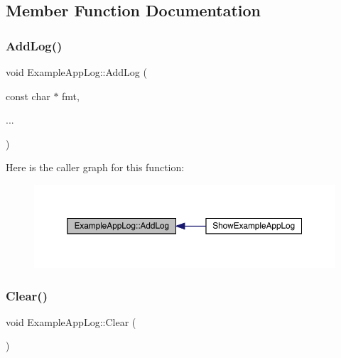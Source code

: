 \subsection{Member Function Documentation}
\mbox{\label{struct_example_app_log_afd296fb3b2559acd341fd92883f8f571}} 
\subsubsection{\texorpdfstring{Add\+Log()}{AddLog()}}
{\footnotesize\ttfamily void Example\+App\+Log\+::\+Add\+Log (\begin{DoxyParamCaption}\item[{const char $\ast$}]{fmt,  }\item[{}]{... }\end{DoxyParamCaption})\hspace{0.3cm}{\ttfamily [inline]}}

Here is the caller graph for this function\+:
\nopagebreak
\begin{figure}[H]
\begin{center}
\leavevmode
\includegraphics[width=350pt]{d1/db8/struct_example_app_log_afd296fb3b2559acd341fd92883f8f571_icgraph}
\end{center}
\end{figure}
\mbox{\label{struct_example_app_log_ab9c298defddbb106fdfe4ab16c5eebac}} 
\subsubsection{\texorpdfstring{Clear()}{Clear()}}
{\footnotesize\ttfamily void Example\+App\+Log\+::\+Clear (\begin{DoxyParamCaption}{ }\end{DoxyParamCaption})\hspace{0.3cm}{\ttfamily [inline]}}

